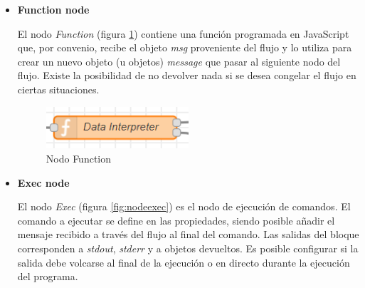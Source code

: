 \begin{itemize}
\item \textbf{Function node}

El nodo \textit{Function} (figura \ref{fig:nodefunction}) contiene una función programada en JavaScript que, por convenio, recibe el objeto \textit{msg} proveniente del flujo y lo utiliza para crear un nuevo objeto (u objetos) \textit{message} que pasar al siguiente nodo del flujo. Existe la posibilidad de no devolver nada si se desea congelar el flujo en ciertas situaciones.

\begin{figure}[H]
\centering
\includegraphics[width=0.5\textwidth]{figuras/fcnNode.png}
\caption{Nodo Function}
\label{fig:nodefunction}
\end{figure}

\item \textbf{Exec node}

El nodo \textit{Exec} (figura \ref{fig:nodeexec}) es el nodo de ejecución de comandos. El comando a ejecutar se define en las propiedades, siendo posible añadir el mensaje recibido a través del flujo al final del comando. Las salidas del bloque corresponden a \textit{stdout}, \textit{stderr} y a objetos devueltos. Es posible configurar si la salida debe volcarse al final de la ejecución o en directo durante la ejecución del programa.


\end{itemize}
